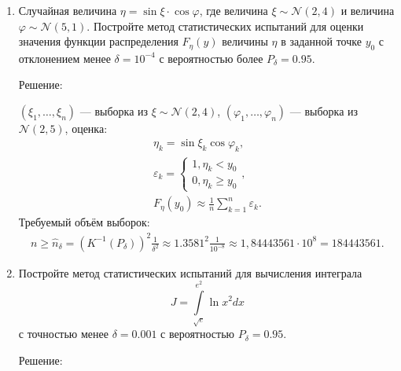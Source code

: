 \documentclass[a4paper,12pt]{article}
\begin{document}
\begin{enumerate}
      \item Случайная величина $\eta = \sin \xi \cdot \cos \varphi$, где величина $\xi \sim \mathcal{N} (2, 4)$ и
            величина $\varphi \sim \mathcal{N} (5, 1)$. Постройте метод статистических испытаний для оценки значения функции распределения
            $F_\eta(y)$ величины $\eta$ в заданной точке $y_0$ с отклонением менее $\delta = 10^{-4}$ с вероятностью более $P_\delta = 0.95$.

            Решение:

            $(\xi_1, \dots, \xi_n)$ --- выборка из $\xi \sim \mathcal{N} \left( 2, 4 \right)$, $(\varphi_1, \dots, \varphi_n)$ --- выборка из $\mathcal{N} (2, 5)$,
            оценка:
            \begin{gather*}
                  \eta_k = \sin \xi_k \cos \varphi_k , \\
                  \varepsilon_k = \left \{
                  \begin{array}{ll}
                        1, \eta_k < y_0 \\
                        0, \eta_k \ge y_0
                  \end{array}
                  \right . , \\
                  F_\eta(y_0) \approx \frac{1}{n} \sum_{k=1}^n \varepsilon_k .
            \end{gather*}
            Требуемый объём выборок:
            \begin{gather*}
                  n \ge \widehat{n}_\delta
                  = \left( K^{-1} ( P_\delta ) \right)^2 \frac{1}{\delta^2}
                  \approx 1.3581^2 \frac{1}{10^{-8}}
                  \approx 1,84443561 \cdot 10^8
                  = 184 443 561 .
            \end{gather*}

      \item Постройте метод статистических испытаний для вычисления интеграла
            \[
                  J = \int \limits_{\sqrt{e}}^{e^2} \ln x^2 dx
            \]
            с точностью менее $\delta = 0.001$ с вероятностью $P_\delta = 0.95$.

            Решение:


\end{enumerate}
\end{document}
